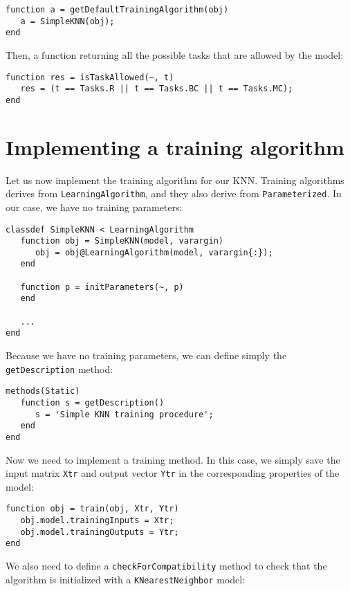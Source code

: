 \begin{lstlisting}
function a = getDefaultTrainingAlgorithm(obj)
   a = SimpleKNN(obj);
end
\end{lstlisting}

\noindent Then, a function returning all the possible tasks that are allowed by the model:

\begin{lstlisting}
function res = isTaskAllowed(~, t)
   res = (t == Tasks.R || t == Tasks.BC || t == Tasks.MC);
end
\end{lstlisting}

\section{Implementing a training algorithm}

Let us now implement the training algorithm for our KNN. Training algorithms derives from \verb|LearningAlgorithm|, and they also derive from \verb|Parameterized|. In our case, we have no training parameters:

\begin{lstlisting}
classdef SimpleKNN < LearningAlgorithm
   function obj = SimpleKNN(model, varargin)
      obj = obj@LearningAlgorithm(model, varargin{:});
   end
        
   function p = initParameters(~, p)
   end
   
   ...
end
\end{lstlisting}

\noindent Because we have no training parameters, we can define simply the \verb|getDescription| method:

\begin{lstlisting}
methods(Static)
   function s = getDescription()
      s = 'Simple KNN training procedure';
   end
end
\end{lstlisting}

\noindent Now we need to implement a training method. In this case, we simply save the input matrix \verb|Xtr| and output vector \verb|Ytr| in the corresponding properties of the model:

\begin{lstlisting}
function obj = train(obj, Xtr, Ytr)
   obj.model.trainingInputs = Xtr;
   obj.model.trainingOutputs = Ytr;                    
end
\end{lstlisting}

\noindent We also need to define a \verb|checkForCompatibility| method to check that the algorithm is initialized with a \verb|KNearestNeighbor| model:

